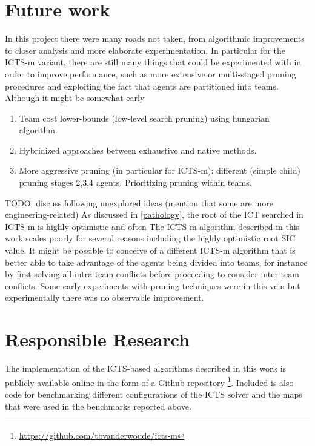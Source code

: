 \documentclass[english,10pt]{article}
\begin{document}
	\section{Future work}
	In this project there were many roads not taken, from algorithmic improvements to closer analysis and more elaborate experimentation. In particular for the ICTS-m variant, there are still many things that could be experimented with in order to improve performance, such as more extensive or multi-staged pruning procedures and exploiting the fact that agents are partitioned into teams. Although it might be somewhat early
	\begin{enumerate}
		\item Team cost lower-bounds (low-level search pruning) using hungarian algorithm.
		\item Hybridized approaches between exhaustive and native methods.
		\item More aggressive pruning (in particular for ICTS-m): different (simple child) pruning stages 2,3,4 agents. Prioritizing pruning within teams.
	\end{enumerate}
	
	TODO: discuss following unexplored ideas (mention that some are more engineering-related)
	As discussed in \ref{pathology}, the root of the ICT searched in ICTS-m is highly optimistic and often 
	The ICTS-m algorithm described in this work scales poorly for several reasons including the highly optimistic root SIC value. It might be possible to conceive of a different ICTS-m algorithm that is better able to take advantage of the agents being divided into teams, for instance by first solving all intra-team conflicts before proceeding to consider inter-team conflicts. Some early experiments with pruning techniques were in this vein but experimentally there was no observable improvement.
	\section{Responsible Research}
	The implementation of the ICTS-based algorithms described in this work is publicly available online in the form of a Github repository \footnote{\url{https://github.com/tbvanderwoude/icts-m}}. Included is also code for benchmarking different configurations of the ICTS solver and the maps that were used in the benchmarks reported above.
	
	\printbibliography
	
\end{document}
